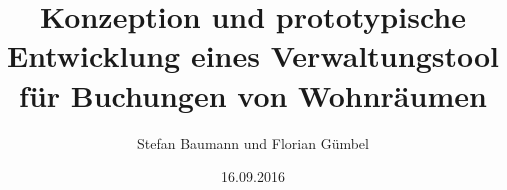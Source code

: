 \documentclass[12pt,fleqn]{book} %
\begin{document}
\newcommand{\ourBookTitle}{Konzeption und prototypische Entwicklung eines Verwaltungstool für Buchungen von Wohnräumen}
\title{\ourBookTitle}
\author{Stefan Baumann und Florian Gümbel}
\newcommand{\ourSubTitle}{Analyse der verteilten Anwendung }
\newcommand{\ourBookDate}{16.09.2016}
\date{\ourBookDate}
\maketitle
\newpage
\thispagestyle{empty}
\mbox{}

\pagebreak
\pagestyle{roman}
\setcounter{page}{3}

\pagebreak

\newpage
\newpage
{
\tableofcontents
\raggedbottom
\pagebreak}

\pagestyle{fancyStd}









\pagebreak
{\listoffigures
\raggedbottom
\pagebreak}
{\lstlistoflistings
\raggedbottom
\pagebreak}
\printbibliography
\glsaddall
\printglossary[nonumberlist]
\end{document}
